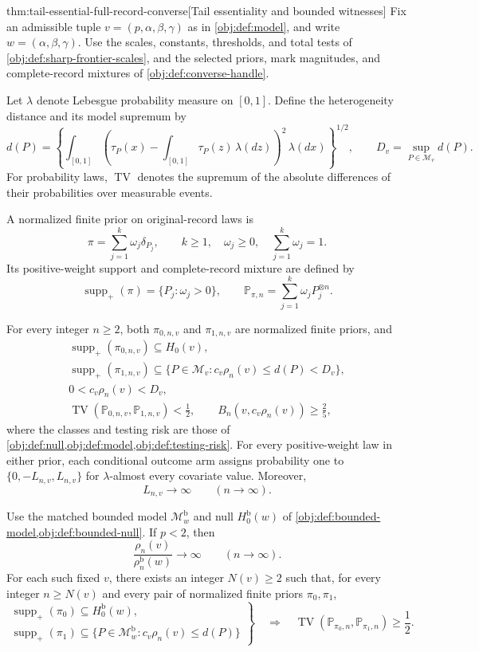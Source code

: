 \documentclass[11pt]{article}
\begin{document}
\begin{theoremv}{thm:tail-essential-full-record-converse}[Tail essentiality and bounded witnesses]
Fix an admissible tuple \(v=(p,\alpha,\beta,\gamma)\) as in \cref{obj:def:model}, and write \(w=(\alpha,\beta,\gamma)\). Use the scales, constants, thresholds, and total tests of \cref{obj:def:sharp-frontier-scales}, and the selected priors, mark magnitudes, and complete-record mixtures of \cref{obj:def:converse-handle}.

Let \(\lambda\) denote Lebesgue probability measure on \([0,1]\). Define the heterogeneity distance and its model supremum by
\[
d(P)=
\left\{\int_{[0,1]}
\left(\tau_P(x)-\int_{[0,1]}\tau_P(z)\,\lambda(dz)\right)^2
\,\lambda(dx)\right\}^{1/2},
\qquad
D_v=\sup_{P\in\mathcal M_v}d(P).
\]
For probability laws, \(\operatorname{TV}\) denotes the supremum of the absolute differences of their probabilities over measurable events.

A normalized finite prior on original-record laws is
\[
\pi=\sum_{j=1}^{k}\omega_j\delta_{P_j},
\qquad
k\ge1,\quad \omega_j\ge0,\quad \sum_{j=1}^{k}\omega_j=1.
\]
Its positive-weight support and complete-record mixture are defined by
\[
\operatorname{supp}_+(\pi)=\{P_j:\omega_j>0\},
\qquad
\mathbb P_{\pi,n}=\sum_{j=1}^{k}\omega_jP_j^{\otimes n}.
\]

For every integer \(n\ge2\), both \(\pi_{0,n,v}\) and \(\pi_{1,n,v}\) are normalized finite priors, and
\[
\begin{gathered}
\operatorname{supp}_+(\pi_{0,n,v})\subseteq H_0(v),\\
\operatorname{supp}_+(\pi_{1,n,v})
\subseteq
\{P\in\mathcal M_v:c_v\rho_n(v)\le d(P)<D_v\},\\
0<c_v\rho_n(v)<D_v,\\
\operatorname{TV}(\mathbb P_{0,n,v},\mathbb P_{1,n,v})<\frac12,
\qquad
B_n(v,c_v\rho_n(v))\ge\frac25,
\end{gathered}
\]
where the classes and testing risk are those of
\cref{obj:def:null,obj:def:model,obj:def:testing-risk}.
For every positive-weight law in either prior, each conditional outcome arm assigns probability one to
\(\{0,-L_{n,v},L_{n,v}\}\) for \(\lambda\)-almost every covariate value. Moreover,
\[
L_{n,v}\longrightarrow\infty
\qquad(n\longrightarrow\infty).
\]

Use the matched bounded model \(\mathcal M^{\mathrm b}_w\) and null
\(H_0^{\mathrm b}(w)\) of
\cref{obj:def:bounded-model,obj:def:bounded-null}.
If \(p<2\), then
\[
\frac{\rho_n(v)}{\rho_n^{\mathrm b}(w)}
\longrightarrow\infty
\qquad(n\longrightarrow\infty).
\]
For each such fixed \(v\), there exists an integer \(N(v)\ge2\) such that, for every integer \(n\ge N(v)\) and every pair of normalized finite priors \(\pi_0,\pi_1\),
\[
\left.
\begin{gathered}
\operatorname{supp}_+(\pi_0)\subseteq H_0^{\mathrm b}(w),\\
\operatorname{supp}_+(\pi_1)\subseteq
\{P\in\mathcal M^{\mathrm b}_w:c_v\rho_n(v)\le d(P)\}
\end{gathered}
\right\}
\quad\Longrightarrow\quad
\operatorname{TV}(\mathbb P_{\pi_0,n},\mathbb P_{\pi_1,n})
\ge\frac12.
\]


\end{theoremv}
\end{document}

